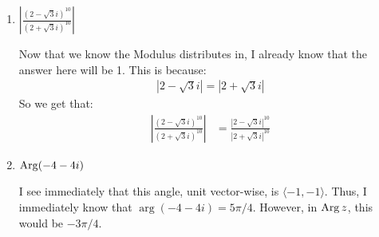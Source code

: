 \begin{enumerate}
\begin{enumerate}
			\begin{problem}
				First, we're going to convert each number to polar form:
				\begin{align*}
					2i &= 2\cdot e^{i(\pi/2)}.\\
					3-i &\rightarrow \sqrt{3^2 + 1} = \sqrt{10}\\
					&\rightarrow \tan^{-1}\cpr{\frac{1}{\sqrt{3}}}=\frac{\pi}6\\
					&= \sqrt{10}\cdot e^{i(\pi/6)}\\
					i+2 &\rightarrow \sqrt{2^2 + 1} = \sqrt{5}\\
					&\rightarrow \tan^{-1}\cpr{\frac{1}2}\\
					&= \sqrt{5}\cdot e ^{i\tan^{-1}(1/2)}
				\end{align*}
				Then, we can simplify a lot easier via exponent rules:
				\begin{align*}
					2\cdot e^{i(\pi/2)}\cdot \sqrt{10}^4\cdot e^{i4\cdot(\pi/6)} = 200 e^{i(7\pi/6)}
				\end{align*}
				Now, we don't care about the angle in the denominator (or the numerator), so we get the final result:
				\begin{align*}
					\left|\frac{2i(3-i)^4}{(i+2)^2}\right|=\frac{200}{\sqrt 5^2}=40
				\end{align*}
			\end{problem}
		\item $\left|\frac{(2-\sqrt{3}i)^{10}}{(2+\sqrt{3}i)^{10}}\right|$
		
			\begin{problem}
				Now that we know the Modulus distributes in, I already know that the answer here will be 1. This is because:
				\begin{align*}
					|2-\sqrt 3 i| = |2+\sqrt 3 i|
				\end{align*}
				So we get that:
				\begin{align*}
					\left|\frac{(2-\sqrt{3}i)^{10}}{(2+\sqrt{3}i)^{10}}\right| &= \frac{|2-\sqrt 3 i|^{10}}{|2+\sqrt 3 i|^{10}}
				\end{align*}
			\end{problem}
			
		\item $\operatorname{Arg}(-4-4i)$
		
			\begin{problem}
				I see immediately that this angle, unit vector-wise, is $\langle -1, -1\rangle$. Thus, I immediately know that $\arg(-4-4i)=5\pi/4$. However, in $\operatorname{Arg}{z}$, this would be $-3\pi/4$. 
			\end{problem}
		

\end{enumerate}
\end{enumerate}
